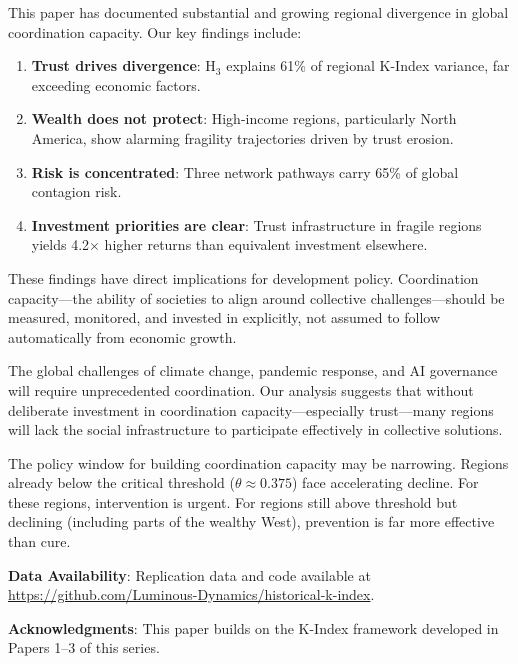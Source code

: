 \documentclass[12pt,a4paper]{article}
\begin{document}
This paper has documented substantial and growing regional divergence in global coordination capacity. Our key findings include:

\begin{enumerate}
    \item \textbf{Trust drives divergence}: H$_3$ explains 61\% of regional K-Index variance, far exceeding economic factors.

    \item \textbf{Wealth does not protect}: High-income regions, particularly North America, show alarming fragility trajectories driven by trust erosion.

    \item \textbf{Risk is concentrated}: Three network pathways carry 65\% of global contagion risk.

    \item \textbf{Investment priorities are clear}: Trust infrastructure in fragile regions yields 4.2$\times$ higher returns than equivalent investment elsewhere.
\end{enumerate}

These findings have direct implications for development policy. Coordination capacity---the ability of societies to align around collective challenges---should be measured, monitored, and invested in explicitly, not assumed to follow automatically from economic growth.

The global challenges of climate change, pandemic response, and AI governance will require unprecedented coordination. Our analysis suggests that without deliberate investment in coordination capacity---especially trust---many regions will lack the social infrastructure to participate effectively in collective solutions.

The policy window for building coordination capacity may be narrowing. Regions already below the critical threshold ($\theta \approx 0.375$) face accelerating decline. For these regions, intervention is urgent. For regions still above threshold but declining (including parts of the wealthy West), prevention is far more effective than cure.

\vspace{1em}
\noindent\textbf{Data Availability}: Replication data and code available at \url{https://github.com/Luminous-Dynamics/historical-k-index}.

\vspace{1em}
\noindent\textbf{Acknowledgments}: This paper builds on the K-Index framework developed in Papers 1--3 of this series.



\end{document}

